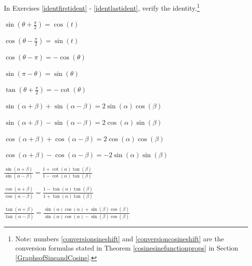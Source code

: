 \documentclass{ximera}
\begin{document}
\begin{question}
    
In Exercises \ref{identfirstident} - \ref{identlastident}, verify the identity.\footnote{Note: numbers \ref{conversionsineshift} and \ref{conversioncosineshift} are the conversion formulas stated in Theorem \ref{cosinesinefunctionprops} in Section \ref{GraphsofSineandCosine}.}

\begin{problem}\label{identfirstident} \label{conversionsineshift}
$\sin\left(\theta + \frac{\pi}{2}\right) = \cos(t)$  
\end{problem}

\begin{problem}\label{conversioncosineshift}
$\cos\left(\theta - \frac{\pi}{2} \right) = \sin(t)$    
\end{problem}

\begin{problem}
$\cos(\theta - \pi) = -\cos(\theta)$    
\end{problem}
 
\begin{problem}
$\sin(\pi - \theta) = \sin(\theta)$
\end{problem}

\begin{problem}
$\tan\left(\theta + \frac{\pi}{2} \right) = -\cot(\theta)$
\end{problem}

\begin{problem}
$\sin(\alpha + \beta) + \sin(\alpha - \beta) = 2\sin(\alpha)\cos(\beta)$  
\end{problem}

\begin{problem}
$\sin(\alpha + \beta) - \sin(\alpha - \beta) = 2\cos(\alpha) \sin(\beta)$
\end{problem}
 
\begin{problem}
$\cos(\alpha + \beta) + \cos(\alpha - \beta) = 2\cos(\alpha) \cos(\beta)$
\end{problem}

\begin{problem}
$\cos(\alpha + \beta) - \cos(\alpha - \beta) = -2\sin(\alpha) \sin(\beta)$
\end{problem}

\begin{problem}
$\frac{\sin(\alpha+\beta)}{\sin(\alpha-\beta)} = \frac{1+\cot(\alpha) \tan(\beta)}{1 - \cot(\alpha) \tan(\beta)}$    
\end{problem} 

\begin{problem}
$\frac{\cos(\alpha + \beta)}{\cos(\alpha - \beta)} = \frac{1 - \tan(\alpha)\tan(\beta)}{1 + \tan(\alpha)\tan(\beta)}$
\end{problem}

\begin{problem}\label{identlastident}
$\frac{\tan(\alpha + \beta)}{\tan(\alpha - \beta)} = \frac{\sin(\alpha)\cos(\alpha) + \sin(\beta)\cos(\beta)}{\sin(\alpha)\cos(\alpha) - \sin(\beta)\cos(\beta)}$
\end{problem}
\end{question}
\end{document}
